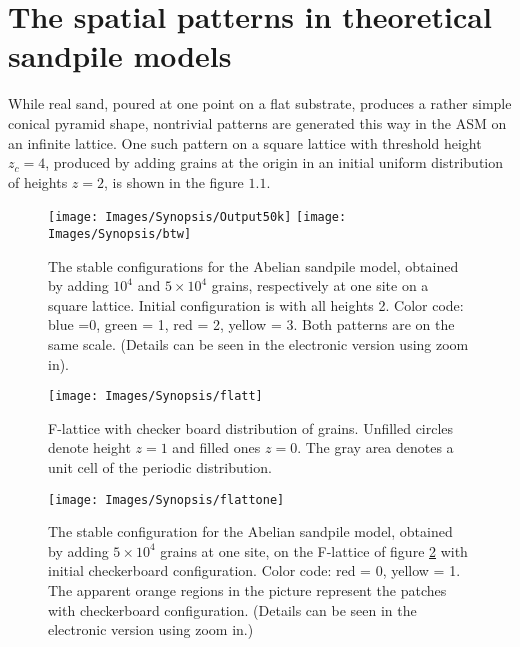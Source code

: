 \documentclass[11pt,a4paper]{book}
\begin{document}
\section[Spatial patterns]{The spatial patterns in theoretical sandpile models}\label{sec:first}
While real sand, poured at one point on a flat substrate, produces a
rather simple conical pyramid shape, nontrivial patterns
are generated this way in the ASM on an infinite lattice.
One such pattern on a square lattice with threshold height
$z_{c}=4$, produced by adding grains at the origin in an initial
uniform distribution of heights $z=2$, is shown in the figure
$1.1$.
\begin{figure}
\texttt{[image: Images/Synopsis/Output50k]}
\texttt{[image: Images/Synopsis/btw]}
\label{fig:btw}
\caption{The stable configurations for the Abelian sandpile model, obtained
by adding $10^4$ and $5 \times 10^{4}$ grains, respectively at one
site on a square lattice. Initial configuration is with all heights 2. Color code:
blue =0, green = 1, red = 2, yellow = 3. Both patterns are on the same
scale. (Details can be seen in the
electronic version using zoom in).}
\end{figure}
\begin{SCfigure}
\texttt{[image: Images/Synopsis/flatt]}
\caption{\label{fig:flatt} F-lattice with checker board distribution
of grains. Unfilled circles denote height $z=1$ and filled ones $z=0$.
The gray area denotes a unit cell of the periodic distribution.}
\end{SCfigure}
\begin{SCfigure}
\texttt{[image: Images/Synopsis/flattone]}
\label{fig:flatone}
\caption{The stable configuration for the Abelian sandpile model, obtained
by adding $5\times10^4$ grains at one site, on the F-lattice of
figure \ref{fig:flatt} with initial checkerboard configuration. Color code: red =
0, yellow = 1. The apparent orange regions in the picture represent the
patches with checkerboard configuration. (Details can be seen in the
electronic version using zoom in.)}
\end{SCfigure}
\end{document}
